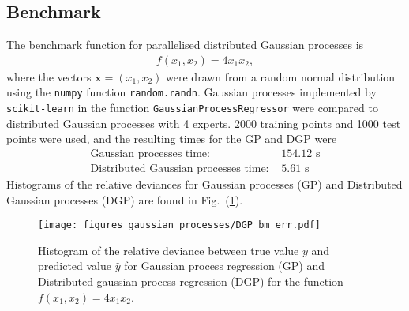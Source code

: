 \documentclass[twoside,english]{uiofysmaster}
\begin{document}
\subsection{Benchmark}

The benchmark function for parallelised distributed Gaussian processes is
\begin{align*}
f(x_1, x_2) =  4x_1x_2,
\end{align*}
where the vectors $\textbf{x} = (x_1, x_2)$ were drawn from a random normal distribution using the \verb|numpy| function \verb|random.randn|. Gaussian processes implemented by \verb|scikit-learn| in the function \verb|GaussianProcessRegressor| were compared to distributed Gaussian processes with 4 experts. 2000 training points and 1000 test points were used, and the resulting times for the GP and DGP were
\begin{align}
\text{Gaussian processes time: }& 154.12 \text{ s}\\
\text{Distributed Gaussian processes time: }& 5.61 \text{ s}
\end{align}
Histograms of the relative deviances for Gaussian processes (GP) and Distributed Gaussian processes (DGP) are found in Fig.\ (\ref{Fig:: gaussian process : DGP BM error histogram}).

\begin{figure}
\centering
\texttt{[image: figures\_gaussian\_processes/DGP\_bm\_err.pdf]}
\caption{Histogram of the relative deviance between true value $y$ and predicted value $\hat{y}$ for Gaussian process regression (GP) and Distributed gaussian process regression (DGP) for the function $f(x_1,x_2) = 4x_1 x_2$.}
\label{Fig:: gaussian process : DGP BM error histogram}
\end{figure}




\end{document}
